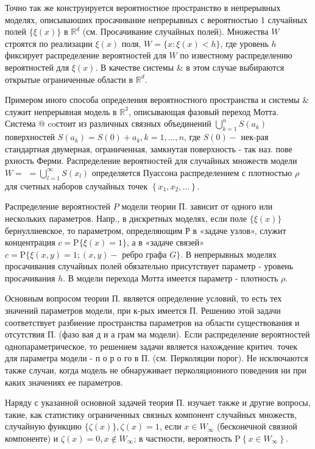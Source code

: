 \documentclass[10pt]{article}
\begin{document}
Точно так же конструируется вероятностное пространство в непрерывных моделях, описываюших просачивание непрерывных с вероятностью 1 случайных полей $\{\xi(x)\}$ в $\mathbb{R}^{d}$ (см. Просачивание случайных полей). Множества $W$ строятся по реализации $\xi(x)$ поля, $W=\{x: \xi(x)<h\}$, где уровень $h$ фиксирует распределение вероятностей для $W$ по известному распределению вероятностей для $\xi(x)$. В качестве системы \& в этом случае выбираются открытые ограниченные области в $\mathbb{R}^{d}$.



Примером иного способа определения вероятностного пространства и системы \& служит непрерывная модель в $\mathbb{R}^{3}$, описывающая фазовый переход Мотта. Система @ coстоит из различных связных объединений $\bigcup_{k=1}^{n} S\left(a_{k}\right)$ поверхностей $S\left(a_{k}\right)=S(0)+a_{k}, k=1, \ldots, n$, где $S(0)-$ нек-рая стандартная двумерная, ограниченная, замкнутая поверхность - так наз. пове рхность Ферми. Распределение вероятностей для случайных множеств модели $W=$ $=\bigcup_{l=1}^{\infty} S\left(x_{l}\right)$ определяется Пуассона распределением с плотностью $\rho$ для счетных наборов случайных точек $\left\{x_{1}, x_{2}, \ldots\right\}$.



Распределение вероятностей $P$ модели теории П. зависит от одного или нескольких параметров. Напр., в дискретных моделях, если поле $\{\xi(x)\}$ бернуллиевское, то параметром, определяющим Р в «задаче узлов», служит концентрация $c=\mathrm{P}\{\xi(x)=1\}$, а в «задаче связей» $c=\mathrm{P}\{\xi(x, y)=1 ;(x, y)-$ ребро графа $G\}$. В непрерывных моделях просачивания случайных полей обязательно присутствует параметр - уровень просачивания $h$. В модели перехода Мотта имеется параметр - плотность $\rho$.



Основным вопросом теории П. является определение условий, то есть тех значений параметров модели, при к-рых имеется П. Решению этой задачи соответствует разбиение пространства параметров на области существования и отсутствия П. (фазо вая д и а грам ма модели). Если распределение вероятностей однопараметрическое, то решением задачи является нахождение критич. точек для параметра модели - п о р о го в П. (см. Перколяции порог). Не исключаются также случаи, когда модель не обнаруживает перколяционного поведения ни при каких значениях ее параметров.



Наряду с указанной основной задачей теория П. изучает также и другие вопросы, такие, как статистику ограниченных связных компонент случайных множеств, случайную функцию $\{\zeta(x)\}, \zeta(x)=1$, если $x \in W_{\infty}$ (бесконечной связной компоненте) и $\zeta(x)=0, x \notin W_{\infty}$; в частности, вероятность $\mathrm{P}\left\{x \in W_{\infty}\right\}$.
\end{document}
